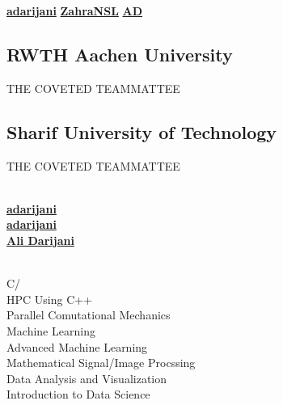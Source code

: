 \documentclass[a4paper]{MagicalCV}
\begin{document}
\lastupdated

  \href{https://github.com/adarijani}{\bf adarijani} 
 \href{https://github.com/ZahraNSL}{\bf ZahraNSL}
 \href{https://www.linkedin.com/in/ali-darijani-675b52241/}{\bf AD}


\begin{minipage}[t]{0.33\textwidth} 


\subsection{RWTH Aachen University}
\vspace{\topsep} %
\begin{tightemize}
\item THE COVETED TEAMMATTEE
\end{tightemize}
\sectionsep

\subsection{Sharif University of Technology}
\begin{tightemize}
\item THE COVETED TEAMMATTEE
\end{tightemize}
\sectionsep

\\
 \href{https://github.com/adarijani}{\bf adarijani} \\
 \href{https://github.com/adarijani}{\bf adarijani} \\
 \href{https://www.linkedin.com/in/ali-darijani-675b52241/}{\bf Ali Darijani}
\sectionsep

\\
C\slash \\
HPC Using C++\\
Parallel Comutational Mechanics\\
Machine Learning\\
Advanced Machine Learning\\
Mathematical Signal/Image Procssing\\
Data Analysis and Visualization\\
Introduction to Data Science\\




\end{minipage}
\end{document}

